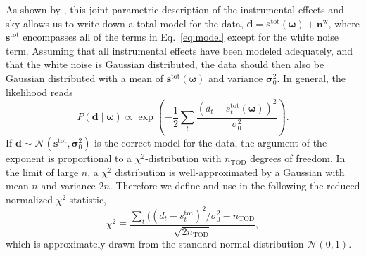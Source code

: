 \documentclass[twocolumn]{../../common/aa}
\begin{document}
As shown by \citet{bp01}, this joint parametric description of the instrumental effects and sky allows us to write down a total model for the data, $\boldsymbol d=\boldsymbol s^\mathrm{tot}(\boldsymbol\omega)+\boldsymbol n^\mathrm w$, where $\boldsymbol s^\mathrm{tot}$ encompasses all of the terms in Eq.~\eqref{eq:model} except for the white noise term. Assuming that all instrumental effects have been modeled adequately, and that the white noise is Gaussian distributed, the data should then also be Gaussian distributed with a mean of $\boldsymbol s^\mathrm{tot}(\boldsymbol\omega)$ and variance $\boldsymbol \sigma_0^2$. In general, the likelihood reads
\begin{equation}
	P(\boldsymbol d\mid\boldsymbol\omega)\propto\exp\left(-\frac12\sum_t\frac{(d_t-s^\mathrm{tot}_t(\boldsymbol\omega))^2}{\sigma_0^2}
	\right).
\end{equation}
If $\boldsymbol d\sim\mathcal N(\boldsymbol s^\mathrm{tot},\boldsymbol\sigma_0^2)$ is the correct model for the data, the argument of the exponent is proportional to a $\chi^2$-distribution with $n_\mathrm{TOD}$ degrees of freedom. In the limit of large $n$, a $\chi^2$ distribution is well-approximated by a Gaussian with mean $n$ and variance $2n$. Therefore we define and use in the following the reduced normalized $\chi^2$ statistic,
\begin{equation}
  \chi^2\equiv \frac{\sum_t((d_t-s_t^\mathrm{tot})^2/\sigma_0^2 - n_\mathrm{TOD}}{\sqrt{2n_\mathrm{TOD}}},
  \label{eq:chisq}
\end{equation}
which is approximately drawn from the standard normal distribution $\mathcal N(0,1)$.
\end{document}
